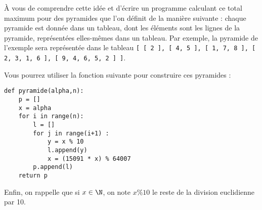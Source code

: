 À vous de comprendre cette idée et d'écrire un programme calculant ce total maximum pour 
des pyramides que l'on définit de la manière suivante : chaque pyramide est donnée dans 
un tableau, dont les éléments sont les lignes de la pyramide, représentées elles-mêmes 
dans un tableau. Par exemple, la pyramide de l'exemple sera représentée dans le tableau 
\texttt{[ [ 2 ], [ 4, 5 ], [ 1, 7, 8 ], [ 2, 3, 1, 6 ], [ 9, 4, 6, 5, 2 ] ]}. 

Vous pourrez utiliser la fonction suivante pour construire ces pyramides :
\begin{lstlisting}
def pyramide(alpha,n):
    p = []
    x = alpha
    for i in range(n):
        l = []
        for j in range(i+1) :
            y = x % 10
            l.append(y)
            x = (15091 * x) % 64007
        p.append(l)
    return p
\end{lstlisting}

Enfin, on rappelle que si $x\in\N$, on note $x\% 10$ le reste de la division euclidienne par 10.


\medskip

